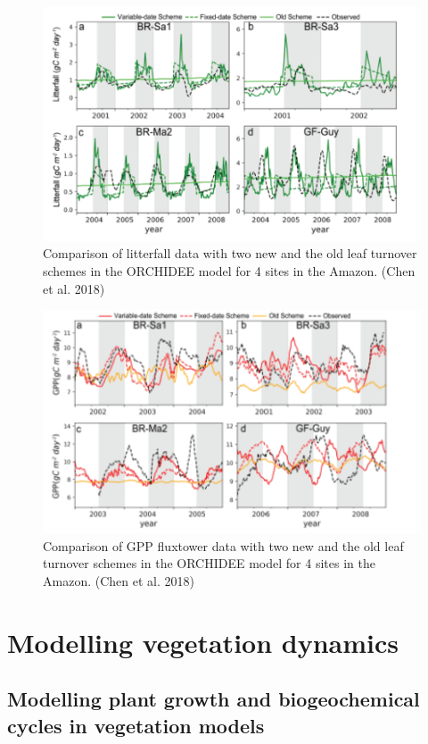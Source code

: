 \documentclass[12pt,oneside]{book}
\begin{document}
\begin{figure}

{\centering \includegraphics[width=0.8\linewidth]{figures/chap4/f412_chen2} 

}

\caption{Comparison of litterfall data with two new and the old leaf turnover schemes in the ORCHIDEE model for 4 sites in the Amazon. (Chen et al. 2018)}\label{fig:f412}
\end{figure}

\begin{figure}

{\centering \includegraphics[width=0.8\linewidth]{figures/chap4/f413_chen3} 

}

\caption{Comparison of GPP fluxtower data with two new and the old leaf turnover schemes in the ORCHIDEE model for 4 sites in the Amazon. (Chen et al. 2018)}\label{fig:f413}
\end{figure}

\part{Modelling vegetation
dynamics}\label{part-modelling-vegetation-dynamics}

\chapter{Modelling plant growth and biogeochemical cycles in vegetation
models}\label{modelling-plant-growth-and-biogeochemical-cycles-in-vegetation-models}
\end{document}
